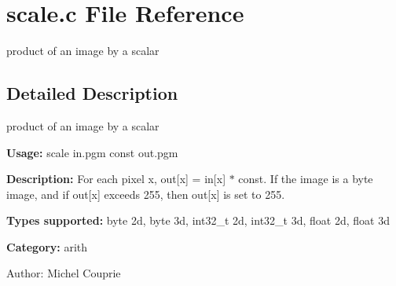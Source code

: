 \section{scale.c File Reference}
\label{scale_8c}
product of an image by a scalar  




\label{_details}
\subsection{Detailed Description}
product of an image by a scalar 

{\bf Usage:} scale in.pgm const out.pgm

{\bf Description:} For each pixel x, out[x] = in[x] $\ast$ const. If the image is a byte image, and if out[x] exceeds 255, then out[x] is set to 255.

{\bf Types supported:} byte 2d, byte 3d, int32\_\-t 2d, int32\_\-t 3d, float 2d, float 3d

{\bf Category:} arith

\begin{Desc}
\item[Author:]Michel Couprie \end{Desc}
